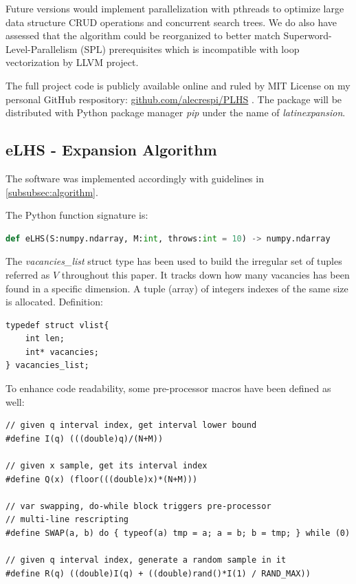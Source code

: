\documentclass[12pt]{extarticle}
\begin{document}
Future versions would implement parallelization with pthreads to optimize large data structure CRUD operations and concurrent search trees. We do also have assessed that the algorithm could be reorganized to better match Superword-Level-Parallelism (SPL) prerequisites which is incompatible with loop vectorization by LLVM project.

The full project code is publicly available online and ruled by MIT License on my personal GitHub respository: \url{github.com/alecrespi/PLHS} . The package will be distributed with Python package manager \emph{pip} under the name of \emph{latinexpansion}.


\subsection{eLHS - Expansion Algorithm}
\label{subsec:eLHS_code}
The software was implemented accordingly with guidelines in \cref{subsubsec:algorithm}.

The Python function signature is:

\begin{lstlisting}[language=Python]
def eLHS(S:numpy.ndarray, M:int, throws:int = 10) -> numpy.ndarray
\end{lstlisting}

The \emph{vacancies{\_}list} struct type has been used to build the irregular set of tuples referred as $V$ throughout this paper. It tracks down how many vacancies has been found in a specific dimension. A tuple (array) of integers indexes of the same size is allocated. Definition:

\begin{lstlisting}[style=CStyle]
typedef struct vlist{
    int len;
    int* vacancies;
} vacancies_list;
\end{lstlisting}

To enhance code readability, some pre-processor macros have been defined as well:

\begin{lstlisting}[style=CStyle]
// given q interval index, get interval lower bound
#define I(q) (((double)q)/(N+M))     

// given x sample, get its interval index
#define Q(x) (floor(((double)x)*(N+M)))     

// var swapping, do-while block triggers pre-processor 
// multi-line rescripting
#define SWAP(a, b) do { typeof(a) tmp = a; a = b; b = tmp; } while (0)  

// given q interval index, generate a random sample in it 
#define R(q) ((double)I(q) + ((double)rand()*I(1) / RAND_MAX))

\end{lstlisting}
\end{document}
